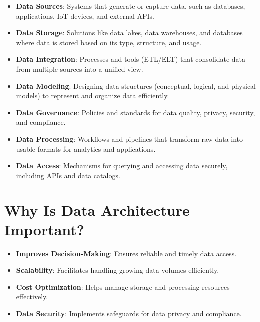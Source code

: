 \begin{itemize}
    \item \textbf{Data Sources}: Systems that generate or capture
    data, such as databases, applications, IoT devices, and
    external APIs.

    \item \textbf{Data Storage}: Solutions like data lakes, data
    warehouses, and databases where data is stored based on its
    type, structure, and usage.

    \item \textbf{Data Integration}: Processes and tools (ETL/ELT)
    that consolidate data from multiple sources into a unified view.

    \item \textbf{Data Modeling}: Designing data structures
    (conceptual, logical, and physical models) to represent and
    organize data efficiently.

    \item \textbf{Data Governance}: Policies and standards for data
    quality, privacy, security, and compliance.

    \item \textbf{Data Processing}: Workflows and pipelines that
    transform raw data into usable formats for analytics and
    applications.

    \item \textbf{Data Access}: Mechanisms for querying and
    accessing data securely, including APIs and data catalogs.
\end{itemize}

\section*{Why Is Data Architecture Important?}

\begin{itemize}
    \item \textbf{Improves Decision-Making}: Ensures reliable and timely data access.
    \item \textbf{Scalability}: Facilitates handling growing data volumes efficiently.
    \item \textbf{Cost Optimization}: Helps manage storage and processing resources effectively.
    \item \textbf{Data Security}: Implements safeguards for data privacy and compliance.
\end{itemize}
























